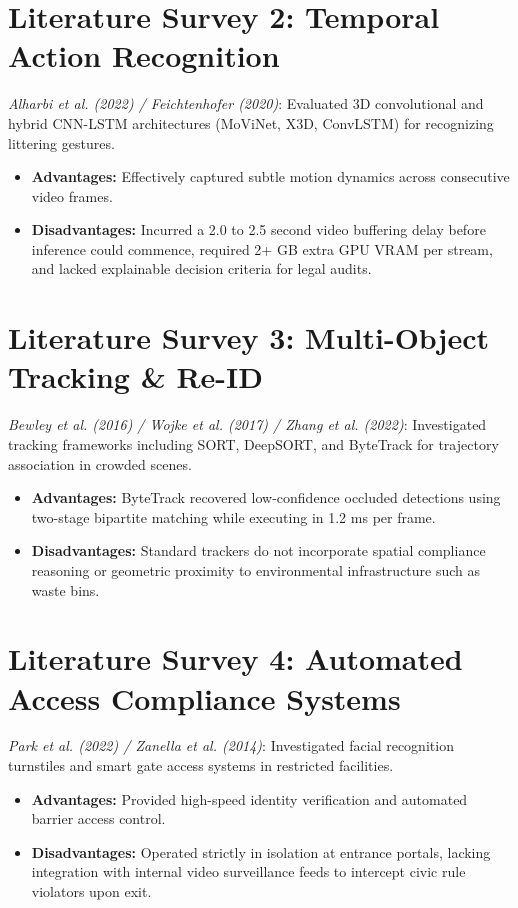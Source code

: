 \documentclass[12pt,a4paper]{report}
\begin{document}
\section{Literature Survey 2: Temporal Action Recognition}
\textit{Alharbi et al. (2022) / Feichtenhofer (2020)}: Evaluated 3D convolutional and hybrid CNN-LSTM architectures (MoViNet, X3D, ConvLSTM) for recognizing littering gestures.
\begin{itemize}
\item \textbf{Advantages:} Effectively captured subtle motion dynamics across consecutive video frames.
\item \textbf{Disadvantages:} Incurred a 2.0 to 2.5 second video buffering delay before inference could commence, required 2+ GB extra GPU VRAM per stream, and lacked explainable decision criteria for legal audits.
\end{itemize}

\section{Literature Survey 3: Multi-Object Tracking \& Re-ID}
\textit{Bewley et al. (2016) / Wojke et al. (2017) / Zhang et al. (2022)}: Investigated tracking frameworks including SORT, DeepSORT, and ByteTrack for trajectory association in crowded scenes.
\begin{itemize}
\item \textbf{Advantages:} ByteTrack recovered low-confidence occluded detections using two-stage bipartite matching while executing in 1.2 ms per frame.
\item \textbf{Disadvantages:} Standard trackers do not incorporate spatial compliance reasoning or geometric proximity to environmental infrastructure such as waste bins.
\end{itemize}

\section{Literature Survey 4: Automated Access Compliance Systems}
\textit{Park et al. (2022) / Zanella et al. (2014)}: Investigated facial recognition turnstiles and smart gate access systems in restricted facilities.
\begin{itemize}
\item \textbf{Advantages:} Provided high-speed identity verification and automated barrier access control.
\item \textbf{Disadvantages:} Operated strictly in isolation at entrance portals, lacking integration with internal video surveillance feeds to intercept civic rule violators upon exit.
\end{itemize}
\end{document}
